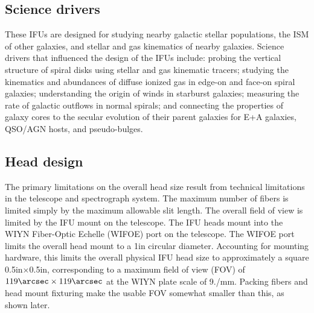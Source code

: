\subsection{Science drivers} 
\label{GPBsub:sec:scidri}
These IFUs are designed for studying nearby galactic stellar populations, the
ISM of other galaxies, and stellar and gas kinematics of nearby galaxies.
Science drivers that influenced the design of the IFUs include: probing the
vertical structure of spiral disks using stellar and gas kinematic tracers;
studying the kinematics and abundances of diffuse ionized gas in edge-on and
face-on spiral galaxies; understanding the origin of winds in starburst
galaxies; measuring the rate of galactic outflows in normal spirals; and
connecting the properties of galaxy cores to the secular evolution of their
parent galaxies for E+A galaxies, QSO/AGN hosts, and pseudo-bulges.



\subsection{Head design} 
\label{GPBsub:sec:heads}
The primary limitations on the overall head size result from technical
limitations in the telescope and spectrograph system.  The maximum number of
fibers is limited simply by the maximum allowable slit length.  The overall
field of view is limited by the IFU mount on the telescope.  The IFU heads
mount into the WIYN Fiber-Optic Echelle (WIFOE) port on the telescope.  The
WIFOE port limits the overall head mount to a 1in circular diameter.
Accounting for mounting hardware, this limits the overall physical IFU head
size to approximately a square 0.5in$\times$0.5in, corresponding to a maximum
field of view (FOV) of $119\arcsec\times119\arcsec$ at the WIYN plate scale of
9./mm.  Packing fibers and head mount fixturing make the usable FOV
somewhat smaller than this, as shown later.


